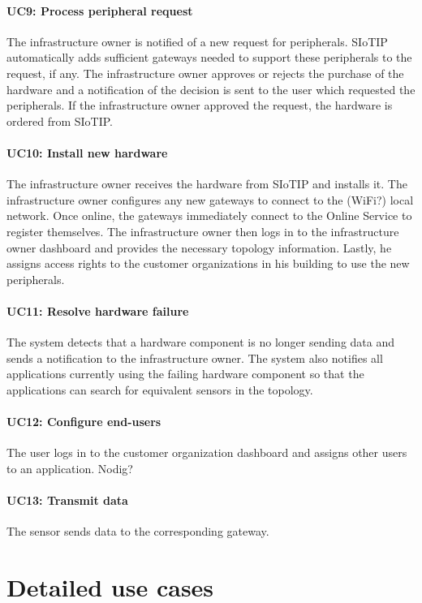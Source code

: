 \documentclass[english]{sareport}
\begin{document}
\paragraph{UC9: Process peripheral request}
The infrastructure owner is notified of a new request for peripherals. SIoTIP automatically adds sufficient gateways needed to support these peripherals to the request, if any. The infrastructure owner approves or rejects the purchase of the hardware and a notification of the decision is sent to the user which requested the peripherals. If the infrastructure owner approved the request, the hardware is ordered from SIoTIP.

\paragraph{UC10: Install new hardware}
The infrastructure owner receives the hardware from SIoTIP and installs it. The infrastructure owner configures any new gateways to connect to the (WiFi?) local network. Once online, the gateways immediately connect to the Online Service to register themselves. The infrastructure owner then logs in to the infrastructure owner dashboard and provides the necessary topology information. Lastly, he assigns access rights to the customer organizations in his building to use the new peripherals.

\paragraph{UC11: Resolve hardware failure}
The system detects that a hardware component is no longer sending data and sends a notification to the infrastructure owner. The system also notifies all applications currently using the failing hardware component so that the applications can search for equivalent sensors in the topology. 

\paragraph{UC12: Configure end-users}
The user logs in to the customer organization dashboard and assigns other users to an application.
Nodig?

\paragraph{UC13: Transmit data}
The sensor sends data to the corresponding gateway. 


\section{Detailed use cases}
\end{document}
